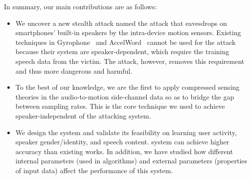 
%
In summary, our main contributions are as follows:
\begin{itemize}
	\item 
	We uncover a new stealth attack named the {\attackName} attack that eavesdrops on smartphones' built-in speakers by the intra-device motion sensors. Existing techniques in Gyrophone~\cite{michalevsky2014gyrophone} and AccelWord~\cite{zhang2015accelword} cannot be used for the {\attackName}  attack because their system are speaker-dependent, which require the training speech data from the victim. The {\attackName}  attack, however, removes this requirement and thus more dangerous and harmful.
	
	\item 
	To the best of our knowledge, we are the first to apply compressed sensing theories in the audio-to-motion side-channel data so as to bridge the gap between sampling rates. This is the core technique we used to achieve speaker-independent of the attacking system.
	
	
	\item 
	We design the {\systemName} system and validate its feasibility on learning user activity, speaker gender/identity, and speech content.  {\systemName} system can achieve higher accuracy than existing works. In addition, we have studied how different internal parameters (used in algorithms) and external parameters (properties of input data) affect the  performance of this system.
	
	
%	
\end{itemize}






















%


